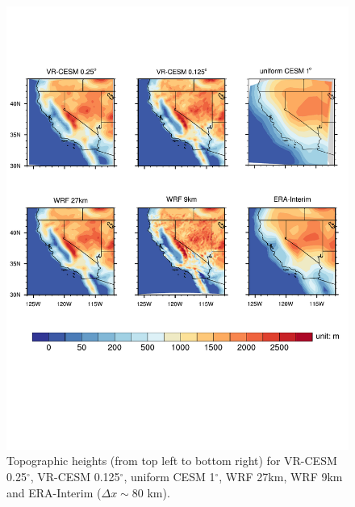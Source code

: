 \documentclass[draft,ms]{agutex}   %
\begin{document}
\begin{figure}
\begin{center}
\includegraphics[width=6in]{topo.pdf}
\end{center}
\caption{Topographic heights (from top left to bottom right) for VR-CESM 0.25$^\circ$, VR-CESM 0.125$^\circ$, uniform CESM 1$^\circ$, WRF 27km, WRF 9km and ERA-Interim ($\Delta x \sim$80 km).} \label{fig:Figure 2} 
\end{figure}
\end{document}
